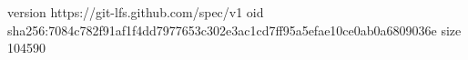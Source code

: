 version https://git-lfs.github.com/spec/v1
oid sha256:7084c782f91af1f4dd7977653c302e3ac1cd7ff95a5efae10ce0ab0a6809036e
size 104590
